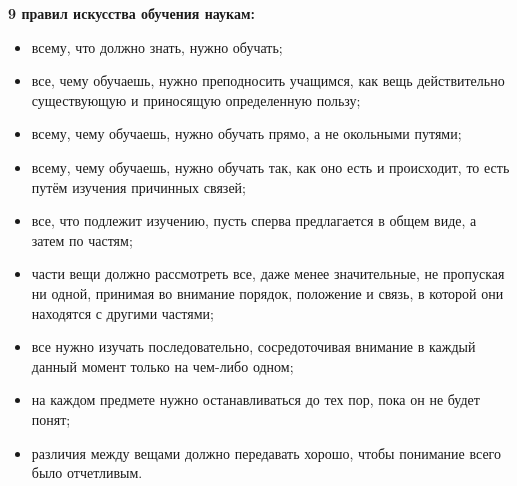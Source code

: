 \documentclass[12pt]{article}			%
\begin{document}
	
	{\bf9 правил искусства обучения наукам:}
	\begin{itemize}
		\item всему, что должно знать, нужно обучать;
		\item все, чему обучаешь, нужно преподносить учащимся, как вещь действительно существующую и приносящую определенную пользу;
		\item всему, чему обучаешь, нужно обучать прямо, а не окольными путями;
		\item всему, чему обучаешь, нужно обучать так, как оно есть и происходит, то есть путём изучения причинных связей;
		\item все, что подлежит изучению, пусть сперва предлагается в общем виде, а затем по частям;
		\item части вещи должно рассмотреть все, даже менее значительные, не пропуская ни одной, принимая во внимание порядок, положение и связь, в которой они находятся с другими частями;
		\item все нужно изучать последовательно, сосредоточивая внимание в каждый данный момент только на чем-либо одном;
		\item на каждом предмете нужно останавливаться до тех пор, пока он не будет понят;
		\item различия между вещами должно передавать хорошо, чтобы понимание всего было отчетливым.
	\end{itemize}
	
\end{document}
